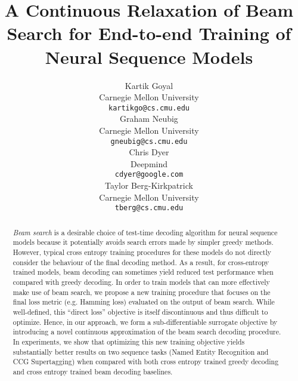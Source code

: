 \documentclass[letterpaper]{article} \usepackage{aaai18}  \usepackage{times}  \usepackage{helvet}  \usepackage{courier}  \usepackage{url}  \usepackage{graphicx}  \frenchspacing
\begin{document}
\title{A Continuous Relaxation of Beam Search for End-to-end Training of Neural Sequence Models}
\author{Kartik Goyal\\
Carnegie Mellon University\\
\texttt{kartikgo@cs.cmu.edu}\\
\And
  Graham Neubig\\
  Carnegie Mellon University \\
\texttt{gneubig@cs.cmu.edu} \\
  \And
  Chris Dyer\\
  Deepmind\\
\texttt{cdyer@google.com} \\
  \And
  Taylor Berg-Kirkpatrick\\
  Carnegie Mellon University\\
\texttt{tberg@cs.cmu.edu} \\
}
\maketitle
\begin{abstract}
\textit{Beam search} is a desirable choice of test-time decoding algorithm for neural sequence models because it potentially avoids search errors made by simpler greedy methods. However, typical cross entropy training procedures for these models do not directly consider the behaviour of the final decoding method. As a result, for cross-entropy trained models, beam decoding can sometimes yield reduced test performance when compared with greedy decoding. In order to train models that can more effectively make use of beam search, we propose a new training procedure that focuses on the final loss metric (e.g. Hamming loss) evaluated on the output of beam search. While well-defined, this ``direct loss'' objective is itself discontinuous and thus difficult to optimize. Hence, in our approach, we form a sub-differentiable surrogate objective by introducing a novel continuous approximation of the beam search decoding procedure. In experiments, we show that optimizing this new training objective yields substantially better results on two sequence tasks (Named Entity Recognition and CCG Supertagging) when compared with both cross entropy trained greedy decoding and cross entropy trained beam decoding baselines.
\end{abstract}
\end{document}
